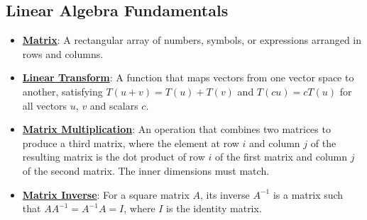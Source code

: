 \documentclass{article}%
\begin{document}
\subsection{Linear Algebra Fundamentals}%
\label{subsec:LinearAlgebraFundamentals}%
\begin{itemize}[leftmargin=*]%
\item \href{\url{https://purdue.brightspace.com/d2l/common/assets/pdfjs-d2l-dist/1.0.14-legacy/web/viewer.html?file=\%252Fcontent\%252Fenforced\%252F1095467-wl.202510.CS.24300.001\%252F04L1-Linear\%20Algebra\%20Primer.pdf\%253Fou\%253D1095467\&lang=en-us\&container=d2l-fileviewer-rendered-pdf\&fullscreen=d2l-fileviewer-rendered-pdf-dialog\&height=667}#page=4}{\textbf{Matrix}}: A rectangular array of numbers, symbols, or expressions arranged in rows and columns.%
\item \href{\url{https://purdue.brightspace.com/d2l/common/assets/pdfjs-d2l-dist/1.0.14-legacy/web/viewer.html?file=\%252Fcontent\%252Fenforced\%252F1095467-wl.202510.CS.24300.001\%252F04L1-Linear\%20Algebra\%20Primer.pdf\%253Fou\%253D1095467\&lang=en-us\&container=d2l-fileviewer-rendered-pdf\&fullscreen=d2l-fileviewer-rendered-pdf-dialog\&height=667}#page=5}{\textbf{Linear Transform}}: A function that maps vectors from one vector space to another, satisfying $T(u + v) = T(u) + T(v)$ and $T(cu) = cT(u)$ for all vectors $u$, $v$ and scalars $c$.%
\item \href{\url{https://purdue.brightspace.com/d2l/common/assets/pdfjs-d2l-dist/1.0.14-legacy/web/viewer.html?file=\%252Fcontent\%252Fenforced\%252F1095467-wl.202510.CS.24300.001\%252F04L1-Linear\%20Algebra\%20Primer.pdf\%253Fou\%253D1095467\&lang=en-us\&container=d2l-fileviewer-rendered-pdf\&fullscreen=d2l-fileviewer-rendered-pdf-dialog\&height=667}#page=14}{\textbf{Matrix Multiplication}}: An operation that combines two matrices to produce a third matrix, where the element at row $i$ and column $j$ of the resulting matrix is the dot product of row $i$ of the first matrix and column $j$ of the second matrix. The inner dimensions must match.%
\item \href{\url{https://purdue.brightspace.com/d2l/common/assets/pdfjs-d2l-dist/1.0.14-legacy/web/viewer.html?file=\%252Fcontent\%252Fenforced\%252F1095467-wl.202510.CS.24300.001\%252F04L1-Linear\%20Algebra\%20Primer.pdf\%253Fou\%253D1095467\&lang=en-us\&container=d2l-fileviewer-rendered-pdf\&fullscreen=d2l-fileviewer-rendered-pdf-dialog\&height=667}#page=10}{\textbf{Matrix Inverse}}: For a square matrix $A$, its inverse $A^{-1}$ is a matrix such that $AA^{-1} = A^{-1}A = I$, where $I$ is the identity matrix.%

\end{itemize}
\end{document}
